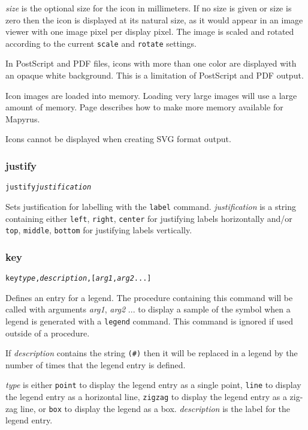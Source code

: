 \textit{size} is the optional size for the icon in millimeters.  If no size
is given or size is zero then the icon is displayed at its natural size,
as it would appear in an image viewer with one image pixel per display
pixel.
The image is scaled and rotated according to the current \texttt{scale}
and \texttt{rotate} settings.

In PostScript and PDF files, icons with more than one color
are displayed with an opaque white background.  This is a limitation
of PostScript and PDF output.

Icon images are loaded into memory.
Loading very large images will use a large amount of memory.
Page \pageref{morememory} describes how to make more memory available
for Mapyrus.

Icons cannot be displayed when creating SVG format output.

\subsubsection{justify}

\begin{alltt}
justify \textit{justification}
\end{alltt}

Sets justification for labelling with the \texttt{label} command.
\textit{justification} is a string containing either
\texttt{left}, \texttt{right}, \texttt{center} for justifying labels
horizontally and/or
\texttt{top}, \texttt{middle}, \texttt{bottom} for justifying labels
vertically.

\subsubsection{key}

\begin{alltt}
key \textit{type}, \textit{description}, [\textit{arg1}, \textit{arg2} ...]
\end{alltt}

Defines an entry for a legend.  The procedure containing this command will be
called with arguments \textit{arg1}, \textit{arg2} ... to display a sample of
the symbol when a legend is generated with a \texttt{legend} command.  This
command is ignored if used outside of a procedure.

If \textit{description} contains the string \texttt{(\#)} then it will
be replaced in a legend by the number of times that the legend entry
is defined.

\textit{type} is either
\texttt{point} to display the legend entry as a single point,
\texttt{line} to display the legend entry as a horizontal line,
\texttt{zigzag} to display the legend entry as a zig-zag line,
or
\texttt{box} to display the legend as a box.
\textit{description} is the label for the legend entry.

